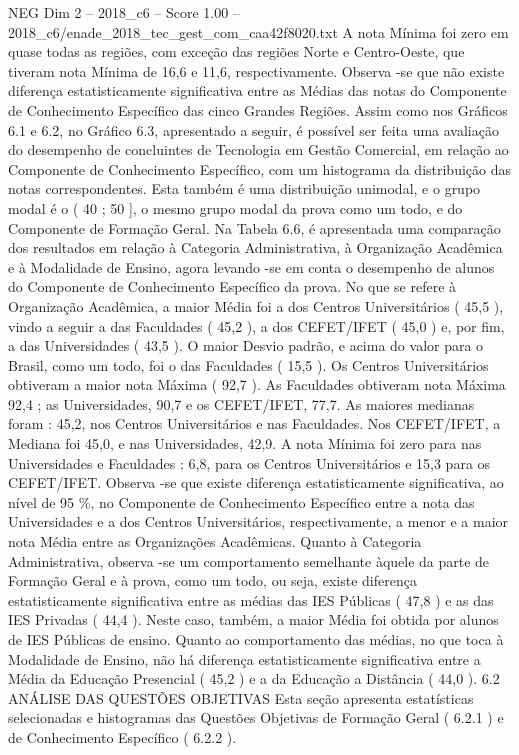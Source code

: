 \begin{textsample}{NEG Dim 2 – 2018\_c6 – Score 1.00 – 2018\_c6/enade\_2018\_tec\_gest\_com\_caa42f8020.txt}
A nota Mínima foi zero em quase todas as regiões, com exceção das regiões Norte e Centro-Oeste, que tiveram nota Mínima de 16,6 e 11,6, respectivamente.
Observa -se que não existe diferença estatisticamente significativa entre as Médias das notas do Componente de Conhecimento Específico das cinco Grandes Regiões.
Assim como nos Gráficos 6.1 e 6.2, no Gráfico 6.3, apresentado a seguir, é possível ser feita uma avaliação do desempenho de concluintes de Tecnologia em Gestão Comercial, em relação ao Componente de Conhecimento Específico, com um histograma da distribuição das notas correspondentes.
Esta também é uma distribuição unimodal, e o grupo modal é o ( 40 ; 50 ], o mesmo grupo modal da prova como um todo, e do Componente de Formação Geral.
Na Tabela 6.6, é apresentada uma comparação dos resultados em relação à Categoria Administrativa, à Organização Acadêmica e à Modalidade de Ensino, agora levando -se em conta o desempenho de alunos do Componente de Conhecimento Específico da prova.
No que se refere à Organização Acadêmica, a maior Média foi a dos Centros Universitários ( 45,5 ), vindo a seguir a das Faculdades ( 45,2 ), a dos CEFET/IFET ( 45,0 ) e, por fim, a das Universidades ( 43,5 ).
O maior Desvio padrão, e acima do valor para o Brasil, como um todo, foi o das Faculdades ( 15,5 ).
Os Centros Universitários obtiveram a maior nota Máxima ( 92,7 ).
As Faculdades obtiveram nota Máxima 92,4 ; as Universidades, 90,7 e os CEFET/IFET, 77,7.
As maiores medianas foram : 45,2, nos Centros Universitários e nas Faculdades.
Nos CEFET/IFET, a Mediana foi 45,0, e nas Universidades, 42,9.
A nota Mínima foi zero para nas Universidades e Faculdades ; 6,8, para os Centros Universitários e 15,3 para os CEFET/IFET.
Observa -se que existe diferença estatisticamente significativa, ao nível de 95 \%, no Componente de Conhecimento Específico entre a nota das Universidades e a dos Centros Universitários, respectivamente, a menor e a maior nota Média entre as Organizações Acadêmicas.
Quanto à Categoria Administrativa, observa -se um comportamento semelhante àquele da parte de Formação Geral e à prova, como um todo, ou seja, existe diferença estatisticamente significativa entre as médias das IES Públicas ( 47,8 ) e as das IES Privadas ( 44,4 ).
Neste caso, também, a maior Média foi obtida por alunos de IES Públicas de ensino.
Quanto ao comportamento das médias, no que toca à Modalidade de Ensino, não há diferença estatisticamente significativa entre a Média da Educação Presencial ( 45,2 ) e a da Educação a Distância ( 44,0 ). 6.2 ANÁLISE DAS QUESTÕES OBJETIVAS Esta seção apresenta estatísticas selecionadas e histogramas das Questões Objetivas de Formação Geral ( 6.2.1 ) e de Conhecimento Específico ( 6.2.2 ).

\end{textsample}

